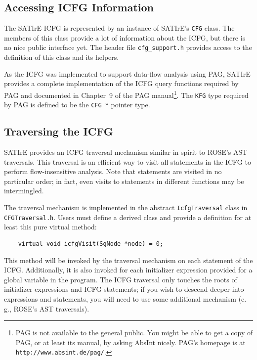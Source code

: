 \documentclass[a4paper,12pt]{report}
\begin{document}
\subsection{Accessing ICFG Information}
\label{sec:icfg_information}

The SATIrE ICFG is represented by an instance of SATIrE's \texttt{CFG}
class. The members of this class provide a lot of information about the
ICFG, but there is no nice public interface yet. The header file
\verb|cfg_support.h| provides access to the definition of this class and its
helpers.

As the ICFG was implemented to support data-flow analysis using PAG, SATIrE
provides a complete implementation of the ICFG query functions required by
PAG and documented in Chapter~9 of the PAG manual\footnote{PAG is not
available to the general public. You might be able to get a copy of PAG,
or at least its manual, by asking AbsInt nicely. PAG's homepage is at
\texttt{http://www.absint.de/pag/}.}. The \texttt{KFG} type
required by PAG is defined to be the \verb|CFG *| pointer type.

\subsection{Traversing the ICFG}
\label{sec:icfg_traversal}

SATIrE provides an ICFG traversal mechanism similar in spirit to ROSE's AST
traversals. This traversal is an efficient way to visit all statements in
the ICFG to perform flow-insensitive analysis. Note that statements are
visited in no particular order; in fact, even visits to statements in
different functions may be intermingled.

The traversal mechanism is implemented in the abstract
\texttt{IcfgTraversal} class in \verb|CFGTraversal.h|. Users must define a
derived class and provide a definition for at least this pure virtual
method:
\begin{verbatim}
    virtual void icfgVisit(SgNode *node) = 0;
\end{verbatim}
This method will be invoked by the traversal mechanism on each statement of
the ICFG. Additionally, it is also invoked for each initializer expression
provided for a global variable in the program. The ICFG traversal only
touches the roots of initializer expressions and ICFG statements; if you
wish to descend deeper into expressions and statements, you will need to use
some additional mechanism (e.\,g., ROSE's AST traversals).
\end{document}
